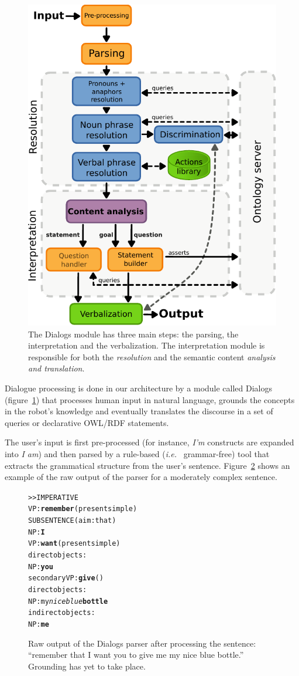\documentclass{svmult}
\newcommand{\ie}{{\textit{i.e.~}}}
\begin{document}
\begin{figure}[!t]
\centering
  \includegraphics[width=0.5\linewidth]{figs/dialog_module_simple.pdf}
  \caption{The {\sc Dialogs} module has three main steps: the parsing,
  the interpretation and the verbalization. The interpretation module is
  responsible for both the \emph{resolution} and the semantic content
  \emph{analysis and translation}.} 
  \label{fig|dialog}
\end{figure}

Dialogue processing is done in our architecture by a module called {\sc
Dialogs}\cite{Lemaignan2011a} (figure~\ref{fig|dialog}) that processes human
input in natural language, grounds the concepts in the robot's knowledge and
eventually translates the discourse in a set of queries or declarative OWL/RDF
statements.  

The user's input is first pre-processed (for instance, \emph{I'm} constructs
are expanded into \emph{I am}) and then parsed by a rule-based (\ie
grammar-free) tool that extracts the grammatical structure from the user's
sentence. Figure~\ref{dialog|parser_output} shows an example of the raw output
of the parser for a moderately complex sentence.

\begin{figure}%
\begin{center}
\scriptsize
\begin{alltt}
>> IMPERATIVE
VP: \textbf{remember} (present simple)
    SUBSENTENCE (aim: that)
      NP: \textbf{I}
      VP: \textbf{want} (present simple)
        direct objects: 
          NP: \textbf{you}
        secondary VP: \textbf{give} ()
              direct objects:
                NP: my \emph{nice blue} \textbf{bottle}
              indirect objects:
                NP: \textbf{me}
\end{alltt}
\end{center}
\caption{Raw output of the {\sc Dialogs} parser after processing the
sentence: ``remember that I want you to give me my nice blue bottle.'' 
Grounding has yet to take place.} 
\label{dialog|parser_output}
\end{figure}
\end{document}
